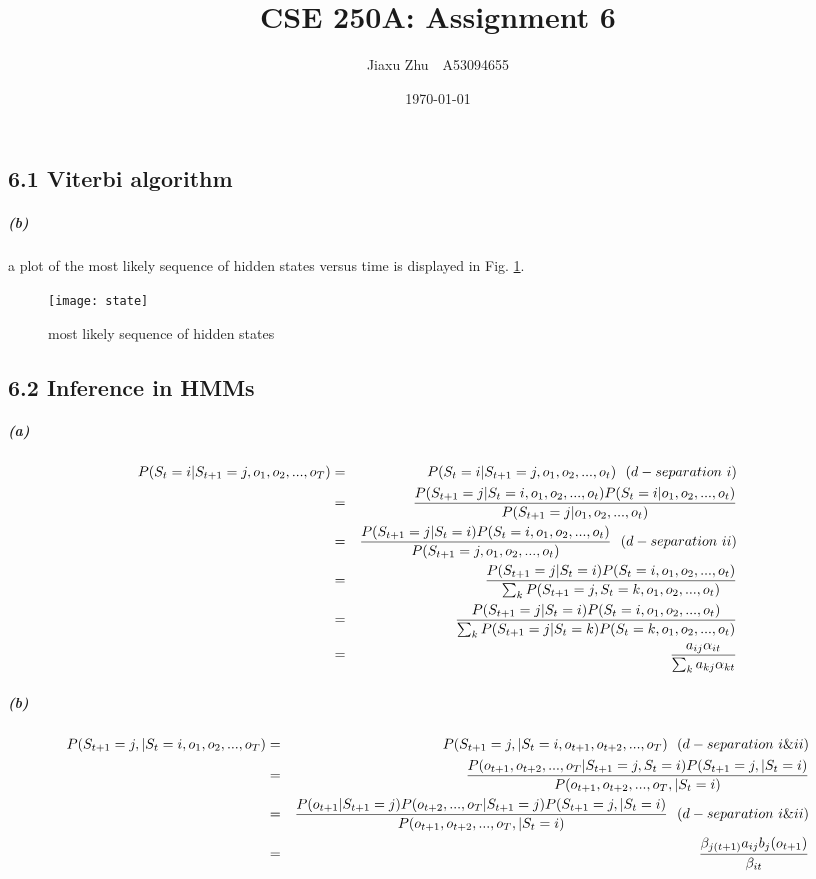\documentclass{article}
\newcommand{\RNum}[1]{\uppercase\expandafter{\romannumeral #1\relax}}
\begin{document}
\title{CSE 250A: Assignment 6}
\author{Jiaxu Zhu~~A53094655}
\date{\today}
\maketitle
\subsection*{6.1 Viterbi algorithm}
\subparagraph*{(b)}
a plot of the most likely sequence of hidden states versus time is displayed in Fig. \ref{state}.

\begin{figure}
	\centering
	\texttt{[image: state]}
	\caption{most likely sequence of hidden states}
	\label{state}
\end{figure}

\subsection*{6.2 Inference in HMMs}
\subparagraph*{(a)}
\begin{eqnarray*}
	P(S_t=i | S_{t+1}=j, o_1, o_2, ..., o_T ) &=& P(S_t=i | S_{t+1}=j, o_1, o_2, ..., o_{t} )~~(d-separation~\RNum{1})\\
	&=& \frac{P(S_{t+1}=j | S_{t}=i, o_1, o_2, ..., o_{t} )P(S_t=i |o_1, o_2, ..., o_{t} )}{P(S_{t+1}=j| o_1, o_2, ..., o_{t} )}\\
	&=& \frac{P(S_{t+1}=j | S_{t}=i )P(S_t=i , o_1, o_2, ..., o_{t} )}{P(S_{t+1}=j, o_1, o_2, ..., o_{t} )}~~(d-separation~\RNum{2})\\
	&=& \frac{P(S_{t+1}=j | S_{t}=i )P(S_t=i , o_1, o_2, ..., o_{t} )}{\sum_k P(S_{t+1}=j, S_t=k, o_1, o_2, ..., o_{t} )}\\
	&=& \frac{P(S_{t+1}=j | S_{t}=i )P(S_t=i , o_1, o_2, ..., o_{t} )}{\sum_k P(S_{t+1}=j | S_t=k)P(S_t=k, o_1, o_2, ..., o_{t} )}\\
	&=& \frac{a_{ij}\alpha_{it}}{\sum_{k} a_{kj}\alpha_{kt}}
\end{eqnarray*}

\subparagraph*{(b)}
\begin{eqnarray*}
	P(S_{t+1}=j, |S_t=i , o_1, o_2, ..., o_T ) &=& P(S_{t+1}=j, |S_t=i , o_{t+1}, o_{t+2}, ..., o_T )~~(d-separation~\RNum{1}\&\RNum{2})\\
	&=& \frac{P(o_{t+1}, o_{t+2}, ..., o_T | S_{t+1}=j, S_t=i)P(S_{t+1}=j, |S_t=i )}{P(o_{t+1}, o_{t+2}, ..., o_T, |S_t=i)}\\
	&=& \frac{P(o_{t+1}|S_{t+1}=j)P(o_{t+2}, ..., o_T | S_{t+1}=j)P(S_{t+1}=j, |S_t=i )}{P(o_{t+1}, o_{t+2}, ..., o_T, |S_t=i)}~~(d-separation~\RNum{1}\&\RNum{2})\\
	&=& \frac{\beta_{j(t+1)}a_{ij}b_j(o_{t+1})}{\beta_{it}}
\end{eqnarray*}
\end{document}
